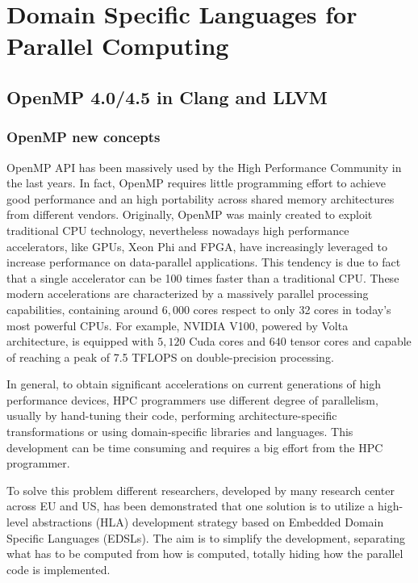 \chapter{Domain Specific Languages for Parallel Computing}


\section{OpenMP 4.0/4.5 in Clang and LLVM}


\subsection{OpenMP new concepts}

OpenMP API has been massively used by the High Performance Community in the last years. In fact, OpenMP requires little programming effort to achieve good performance and an high portability across shared memory architectures from different vendors. Originally, OpenMP was mainly created to exploit traditional CPU technology, nevertheless nowadays high performance accelerators, like GPUs, Xeon Phi and FPGA, have increasingly leveraged to increase performance on data-parallel applications. This tendency is due to fact that a single accelerator can be 100 times faster than a traditional CPU. These modern accelerations are characterized by a massively parallel processing capabilities, containing around $6,000$ cores respect to only 32 cores in today’s most powerful CPUs. For example, NVIDIA V100, powered by Volta architecture, is equipped with $5,120$ Cuda cores and $640$ tensor cores and capable of reaching a peak of 7.5 TFLOPS on double-precision processing. %

In general, to obtain significant accelerations on current generations of high performance devices, HPC programmers use different degree of parallelism, usually by hand-tuning their code, performing architecture-specific transformations or using domain-specific libraries and languages. This development can be time consuming and requires a big effort from the HPC programmer.

To solve this problem different researchers, developed by many research center across EU and US, has been demonstrated that one solution is to utilize a high-level abstractions (HLA) development strategy based on Embedded Domain Specific Languages (EDSLs). The aim is to simplify the development, separating what has to be computed from how is computed, totally hiding how the parallel code is implemented. 

